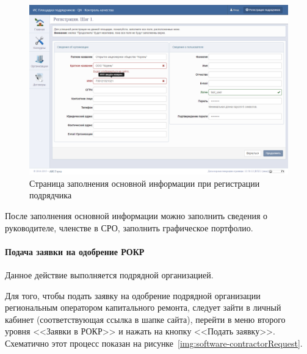 \begin{figure}[h!]
	\begin{center}
		\begin{minipage}[h]{\linewidth}
			\centering
			\includegraphics[width=\linewidth]{images/software-contractorRegistration.png}
			\caption{Страница заполнения основной информации при регистрации подрядчика}
			\label{img:software-contractorRegistration}
		\end{minipage}
		\hfill
	\end{center}
\end{figure}

После заполнения основной информации можно заполнить сведения о руководителе, членстве в СРО, заполнить графическое портфолио.

\paragraph{Подача заявки на одобрение РОКР}

Данное действие выполняется подрядной организацией.

Для того, чтобы подать заявку на одобрение подрядной организации региональным оператором капитального ремонта, следует зайти в личный кабинет (соответствующая ссылка в шапке сайта), перейти в меню второго уровня <<Заявки в РОКР>> и нажать на кнопку <<Подать заявку>>.
Схематично этот процесс показан на рисунке~\ref{img:software-contractorRequest}.

